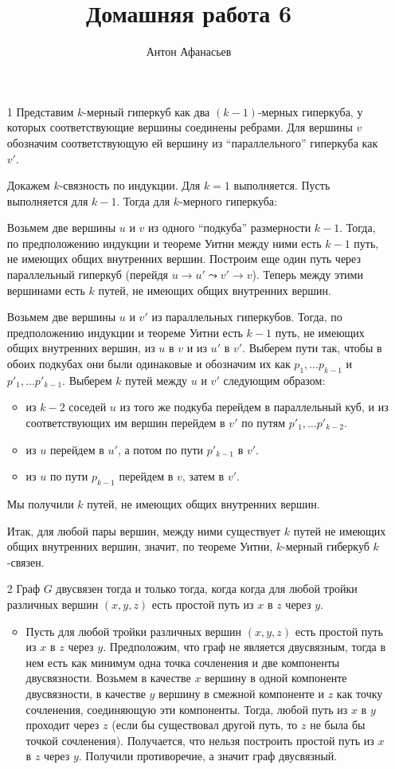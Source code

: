 \documentclass[10pt]{article}
\begin{document}
\title{Домашняя работа 6}
\author{Антон Афанасьев}
\maketitle

\begin{enumerate}
\item[1] Представим $k$-мерный гиперкуб как два $(k-1)$-мерных гиперкуба, у которых соответствующие вершины соединены ребрами. Для вершины $v$ обозначим соответствующую ей вершину из ``параллельного'' гиперкуба как $v'$. 

Докажем $k$-связность по индукции. Для $k=1$ выполняется. Пусть выполняется для $k-1$. Тогда для $k$-мерного гиперкуба:

Возьмем две вершины $u$ и $v$ из одного ``подкуба'' размерности $k-1$. Тогда, по предположению индукции и теореме Уитни между ними есть $k-1$ путь, не имеющих общих внутренних вершин. Построим еще один путь через параллельный гиперкуб (перейдя $u \to u' \leadsto v' \to v$). Теперь между этими вершинами есть $k$ путей, не имеющих общих внутренних вершин.

Возьмем две вершины $u$ и $v'$ из параллельных гиперкубов. Тогда, по предположению индукции  и теореме Уитни есть $k-1$ путь, не имеющих общих внутренних вершин, из $u$ в $v$ и из $u'$ в $v'$. Выберем пути так, чтобы в обоих подкубах они были одинаковые и обозначим их как $p_1, \ldots p_{k-1}$ и $p'_1, \ldots p'_{k-1}$. Выберем $k$ путей между $u$ и $v'$ следующим образом: 
\begin{itemize}
\item из $k-2$ соседей $u$ из того же подкуба перейдем в параллельный куб, и из соответствующих им вершин перейдем в $v'$ по путям $p'_1, \ldots p'_{k-2}$.
\item из $u$ перейдем в $u'$, а потом по пути $p'_{k-1}$ в $v'$.
\item из $u$ по пути $p_{k-1}$ перейдем в $v$, затем в $v'$.
\end{itemize}
Мы получили $k$ путей, не имеющих общих внутренних вершин.

Итак, для любой пары вершин, между ними существует $k$ путей не имеющих общих внутренних вершин, значит, по теореме Уитни, $k$-мерный гиберкуб $k$-связен.

\item[2] Граф $G$ двусвязен тогда и только тогда, когда когда для любой тройки различных вершин $(x, y, z)$ есть простой путь из $x$ в $z$ через $y$. 
\begin{itemize}
	\item Пусть для любой тройки различных вершин $(x, y, z)$ есть простой путь из $x$ в $z$ через $y$. Предположим, что граф не является двусвязным, тогда в нем есть как минимум одна точка сочленения и две компоненты двусвязности. Возьмем в качестве $x$ вершину в одной компоненте двусвязности, в качестве $y$ вершину в смежной компоненте и $z$ как точку сочленения, соединяющую эти компоненты. Тогда, любой путь из $x$ в $y$ проходит через $z$ (если бы существовал другой путь, то $z$ не была бы точкой сочленения). Получается, что нельзя построить простой путь из $x$ в $z$ через $y$. Получили противоречие, а значит граф двусвязный.
	

\end{itemize}
\end{enumerate}
\end{document}
